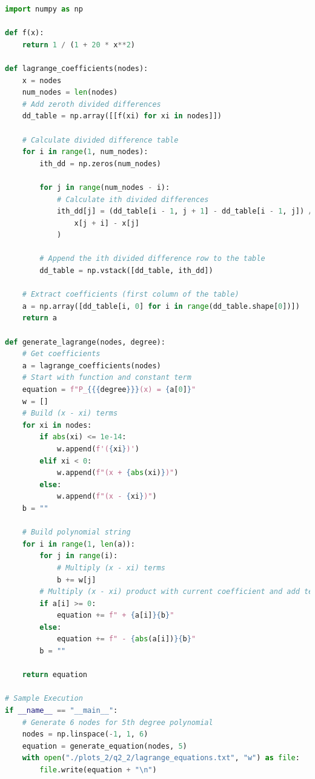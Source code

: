 \documentclass[12pt]{article}
\begin{document}
\begin{lstlisting}[language=Python, caption=2.1 Python]
import numpy as np

def f(x):
    return 1 / (1 + 20 * x**2)

def lagrange_coefficients(nodes):
    x = nodes
    num_nodes = len(nodes)
    # Add zeroth divided differences
    dd_table = np.array([[f(xi) for xi in nodes]])

    # Calculate divided difference table
    for i in range(1, num_nodes):
        ith_dd = np.zeros(num_nodes)

        for j in range(num_nodes - i):
            # Calculate ith divided differences
            ith_dd[j] = (dd_table[i - 1, j + 1] - dd_table[i - 1, j]) / (
                x[j + i] - x[j]
            )

        # Append the ith divided difference row to the table
        dd_table = np.vstack([dd_table, ith_dd])

    # Extract coefficients (first column of the table)
    a = np.array([dd_table[i, 0] for i in range(dd_table.shape[0])])
    return a

def generate_lagrange(nodes, degree):
    # Get coefficients
    a = lagrange_coefficients(nodes)
    # Start with function and constant term
    equation = f"P_{{{degree}}}(x) = {a[0]}"
    w = []
    # Build (x - xi) terms
    for xi in nodes:
        if abs(xi) <= 1e-14:
            w.append(f'({xi})')
        elif xi < 0:
            w.append(f"(x + {abs(xi)})")
        else:
            w.append(f"(x - {xi})")
    b = ""

    # Build polynomial string
    for i in range(1, len(a)):
        for j in range(i):
            # Multiply (x - xi) terms
            b += w[j]
        # Multiply (x - xi) product with current coefficient and add term
        if a[i] >= 0:
            equation += f" + {a[i]}{b}"
        else:
            equation += f" - {abs(a[i])}{b}"
        b = ""

    return equation

# Sample Execution
if __name__ == "__main__":
    # Generate 6 nodes for 5th degree polynomial
    nodes = np.linspace(-1, 1, 6)
    equation = generate_equation(nodes, 5)
    with open("./plots_2/q2_2/lagrange_equations.txt", "w") as file:
        file.write(equation + "\n")

\end{lstlisting}
\end{document}
